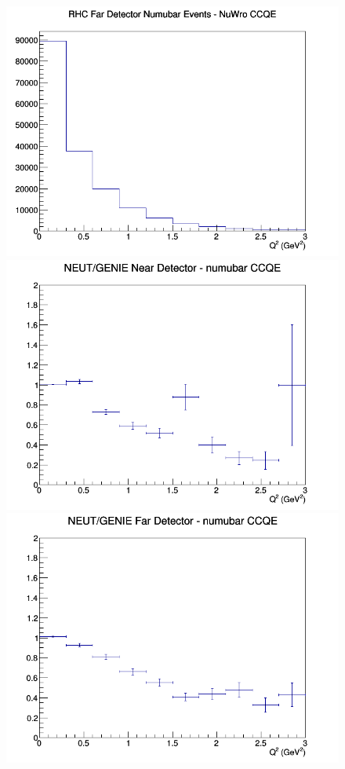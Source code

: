 \documentclass[12pt]{article}
\begin{document}
\begin{figure}[h]
\endminipage
{}
\includegraphics[width=\linewidth]{eff_Q2/FGT/CCQE_RHC_FD_numubar_Q2_NuWro.png}
\endminipage
\newline
{}
\includegraphics[width=\linewidth]{eff_Q2/FGT/ratios/CCQE_NEUT_GENIE_numubar_near_Q2.png}
\endminipage
{}
\includegraphics[width=\linewidth]{eff_Q2/FGT/ratios/CCQE_NEUT_GENIE_numubar_far_Q2.png}

\end{figure}
\end{document}
